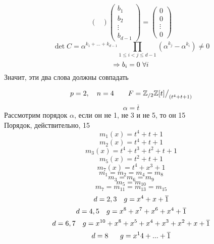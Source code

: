 \documentclass[main]{subfiles}
\begin{document}
\begin{Definition}
\[\begin{pmatrix}
        \end{pmatrix} \begin{pmatrix}
            b_1\\
            b_2\\
            \vdots\\
            b_{d - 1}
        \end{pmatrix} = \begin{pmatrix}
            0\\
            0\\
            \vdots\\
            0
        \end{pmatrix}\]
        \[\det C = \alpha^{k_1 + ... + k_{d - 1} } \prod_{1 \leq i < j \leq d - 1}(\alpha^{k_j} - \alpha^{k_i})
        \neq 0\]
        \[\Rightarrow b_i = 0 \ \forall i\]
        Значит, эти два слова должны совпадать
    \end{Definition}

    \begin{Example}
        \[p = 2, \quad n = 4 \qquad F = \mathbb{Z}_{/2}\mathbb{Z}[t]\big/_{(t^4 + t + 1)}  \]
        \[\alpha = \overline{t}\]
        Рассмотрим порядок $\alpha$, если он не 1, не 3 и не 5, то он 15\\
        Порядок, действительно, 15
        \[m_1(x) = t^4  + t + 1\]
        \[m_2(x) = t^4 + t + 1\]
        \[m_3(x) = t^4 + t^3 + t^2 + t + 1\]
        \[m_5(x) = t^2 + t + 1\]
        \[m_{7}(x) = t^4 + x^3 + 1 \]
        \[m_1 = m_2 = m_4 = m_8 \]
        \[m_3 = m_6 = m_9\]
        \[m_5 = m_{10} \]
        \[m_7 = m_{11}  = m_{13}  = m_{15} \]
        \[d = 2, 3 \quad g = x^4 + x + \overline{1}\]
        \[d = 4, 5 \quad g = x^8 + x^7 + x^6 + x^4 + \overline{1}\]
        \[d = 6, 7 \quad g = x^{10} + x^8 + x^5 + x^4 + x^3 + x^2 + x + \overline{1} \]
        \[d = 8 \ \ \quad g = x^14 + ... + \overline{1}\]
    \end{Example}
\end{document}
